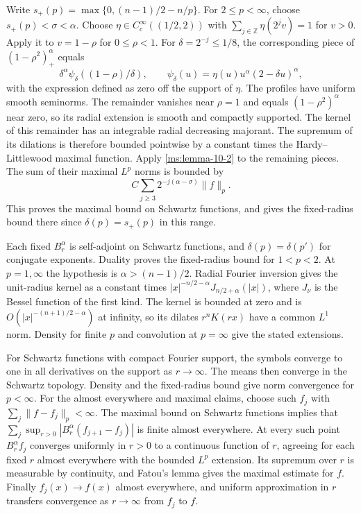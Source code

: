 Write $s_+(p)=\max\{0,(n-1)/2-n/p\}$. For $2\le p<\infty$, choose $s_+(p)<\sigma<\alpha$. Choose $\eta\in C_c^\infty((1/2,2))$ with $\sum_{j\in\mathbb Z}\eta(2^jv)=1$ for $v>0$. Apply it to $v=1-\rho$ for $0\le\rho<1$. For $\delta=2^{-j}\le1/8$, the corresponding piece of $(1-\rho^2)_+^\alpha$ equals
\[
\delta^\alpha\psi_\delta((1-\rho)/\delta),\qquad
\psi_\delta(u)=\eta(u)u^\alpha(2-\delta u)^\alpha,
\]
with the expression defined as zero off the support of $\eta$. The profiles have uniform smooth seminorms. The remainder vanishes near $\rho=1$ and equals $(1-\rho^2)^\alpha$ near zero, so its radial extension is smooth and compactly supported. The kernel of this remainder has an integrable radial decreasing majorant. The supremum of its dilations is therefore bounded pointwise by a constant times the Hardy--Littlewood maximal function. Apply \ref{ms:lemma-10-2} to the remaining pieces. The sum of their maximal $L^p$ norms is bounded by
\[
C\sum_{j\ge3}2^{-j(\alpha-\sigma)}\|f\|_p.
\]
This proves the maximal bound on Schwartz functions, and gives the fixed-radius bound there since $\delta(p)=s_+(p)$ in this range.

Each fixed $B_r^\alpha$ is self-adjoint on Schwartz functions, and $\delta(p)=\delta(p')$ for conjugate exponents. Duality proves the fixed-radius bound for $1<p<2$. At $p=1,\infty$ the hypothesis is $\alpha>(n-1)/2$. Radial Fourier inversion gives the unit-radius kernel as a constant times $|x|^{-n/2-\alpha}J_{n/2+\alpha}(|x|)$, where $J_\nu$ is the Bessel function of the first kind. The kernel is bounded at zero and is $O(|x|^{-(n+1)/2-\alpha})$ at infinity, so its dilates $r^nK(rx)$ have a common $L^1$ norm. Density for finite $p$ and convolution at $p=\infty$ give the stated extensions.

For Schwartz functions with compact Fourier support, the symbols converge to one in all derivatives on the support as $r\to\infty$. The means then converge in the Schwartz topology. Density and the fixed-radius bound give norm convergence for $p<\infty$. For the almost everywhere and maximal claims, choose such $f_j$ with $\sum_j\|f-f_j\|_p<\infty$. The maximal bound on Schwartz functions implies that $\sum_j\sup_{r>0}|B_r^\alpha(f_{j+1}-f_j)|$ is finite almost everywhere. At every such point $B_r^\alpha f_j$ converges uniformly in $r>0$ to a continuous function of $r$, agreeing for each fixed $r$ almost everywhere with the bounded $L^p$ extension. Its supremum over $r$ is measurable by continuity, and Fatou's lemma gives the maximal estimate for $f$. Finally $f_j(x)\to f(x)$ almost everywhere, and uniform approximation in $r$ transfers convergence as $r\to\infty$ from $f_j$ to $f$.
